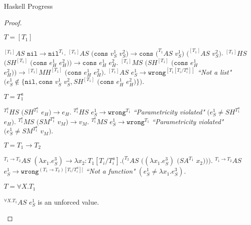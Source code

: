 \begin{theorem}{Haskell Progress}
\begin{proof}
\begin{case}
\begin{subcase}

$T=[T_{1}]$

$^{[T_{1}]}AS$ $\mathtt{nil}\rightarrow\mathtt{nil}^{T_{1}}$.  $^{[T_{1}]}AS$ $(\mathtt{cons}$ $v_{S}^{1}$ $v_{S}^{2})\rightarrow\mathtt{cons}$ $(^{T_{1}}AS$ $v_{S}^{1})$ $(^{[T_{1}]}AS$ $v_{S}^{2})$.  $^{[T_{1}]}HS$ $(SH^{[T_{1}]}$ $(\mathtt{cons}$ $e_{H}^{1}$ $e_{H}^{2}))\rightarrow\mathtt{cons}$ $e_{H}^{1}$ $e_{H}^{2}$.  $^{[T_{1}]}MS$ $(SH^{[T_{1}]}$ $(\mathtt{cons}$ $e_{H}^{1}$ $e_{H}^{2}))\rightarrow{^{[T_{1}]}M}H^{[T_{1}]}$ $(\mathtt{cons}$ $e_{H}^{1}$ $e_{H}^{2})$.  $^{[T_{1}]}AS$ $e_{S}^{1}\rightarrow\mathtt{wrong}^{[T_{1}[T_{i}/T_{i}^{a}]]}$ \emph{``Not a list"} $(e_{S}^{1}\not\in\lbrace\mathtt{nil},\mathtt{cons}$ $v_{S}^{1}$ $v_{S}^{2},SH^{[T_{1}]}$ $(\mathtt{cons}$ $e_{H}^{1}$ $e_{H}^{2})\rbrace)$.

\end{subcase}

\begin{subcase}

$T=T_{1}^{a}$

$^{T_{1}^{a}}HS$ $(SH^{T_{1}^{a}}$ $e_{H})\rightarrow e_{H}$.  $^{T_{1}^{a}}HS$ $e_{S}^{1}\rightarrow\mathtt{wrong}^{T_{1}}$ \emph{``Parametricity violated"} $(e_{S}^{1}\neq SH^{T_{1}^{a}}$ $e_{H})$.  $^{T_{1}^{a}}MS$ $(SM^{T_{1}^{a}}$ $v_{M})\rightarrow v_{M}$.  $^{T_{1}^{a}}MS$ $e_{S}^{1}\rightarrow\mathtt{wrong}^{T_{1}}$ \emph{``Parametricity violated"} $(e_{S}^{1}\neq SM^{T_{1}^{a}}$ $v_{M})$.

\end{subcase}

\begin{subcase}

$T=T_{1}\rightarrow T_{2}$

$^{T_{1}\rightarrow T_{2}}AS$ $(\lambda x_{1}.e_{S}^{3})\rightarrow\lambda x_{2}:T_{1}[T_{i}/T^{a}_{i}].(^{T_{2}}AS$ $((\lambda x_{1}.e_{S}^{3})$ $(SA^{T_{1}}$ $x_{2})))$.  $^{T_{1}\rightarrow T_{2}}AS$ $e_{S}^{1}\rightarrow\mathtt{wrong}^{(T_{1}\rightarrow T_{2})[T_{i}/T_{i}^{a}]]}$ \emph{``Not a function"} $(e_{S}^{1}\neq\lambda x_{1}.e_{S}^{3})$.

\end{subcase}

\begin{subcase}

$T=\forall X.T_{1}$

$^{\forall X.T_{1}}AS$ $e_{S}^{1}$ is an unforced value.


\end{subcase}
\end{case}
\end{proof}
\end{theorem}
